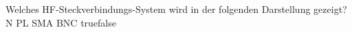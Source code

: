     {Welches HF-Steckverbindungs-System wird in der folgenden Darstellung gezeigt? }
    {N}
    {PL}
    {SMA}
    {BNC}
    {true}{false}